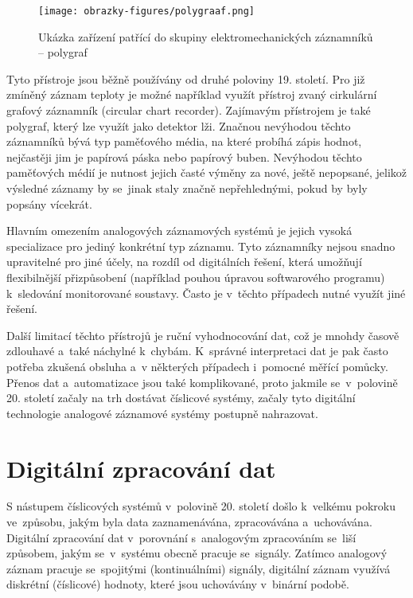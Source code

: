 
\begin{figure}[h] %
    \centering
    \texttt{[image: obrazky-figures/polygraaf.png]}
    \caption{Ukázka zařízení patřící do skupiny elektromechanických záznamníků -- polygraf~\cite{polygraph_picture}}
    \label{fig:polygraaf}
\end{figure}


Tyto přístroje jsou běžně používány od druhé poloviny 19. století. Pro již zmíněný záznam teploty je možné například využít přístroj zvaný cirkulární grafový záznamník (circular chart recorder). Zajímavým přístrojem je také polygraf, který lze využít jako detektor lži. Značnou nevýhodou těchto záznamníků bývá typ paměťového média, na které probíhá zápis hodnot, nejčastěji jim je papírová páska nebo papírový buben. Nevýhodou těchto paměťových médií je nutnost jejich časté výměny za nové, ještě nepopsané, jelikož výsledné záznamy by se~jinak staly značně nepřehlednými, pokud by byly popsány vícekrát.~\cite{origin_of_chart_recorders}

Hlavním omezením analogových záznamových systémů je jejich vysoká specializace pro jediný konkrétní typ záznamu. Tyto záznamníky nejsou snadno upravitelné pro jiné účely, na rozdíl od digitálních řešení, která umožňují flexibilnější přizpůsobení (například pouhou úpravou softwarového programu) k~sledování monitorované soustavy. Často je v~těchto případech nutné využít jiné řešení.~\cite{analog_signal_and_digital_signal_processing_Tel_System}

Další limitací těchto přístrojů je ruční vyhodnocování dat, což je mnohdy časově zdlouhavé a~také náchylné k~chybám. K~správné interpretaci dat je pak často potřeba zkušená obsluha a~v některých případech i~pomocné měřící pomůcky. Přenos dat a~automatizace jsou také komplikované, proto jakmile se~v~polovině 20. století začaly na trh dostávat číslicové systémy, začaly tyto digitální technologie analogové záznamové systémy postupně nahrazovat.~\cite{rcp_analog_vs_digital, newcastle_history_of_digital_computers}


\section{Digitální zpracování dat}
\label{digitalni_zaznam_dat}
S nástupem číslicových systémů v~polovině 20. století došlo k~velkému pokroku ve~způsobu, jakým byla data zaznamenávána, zpracovávána a~uchovávána. Digitální zpracování dat v~porovnání s~analogovým zpracováním se~liší způsobem, jakým se~v~systému obecně pracuje se~signály. Zatímco analogový záznam pracuje se~spojitými (kontinuálními) signály, digitální záznam využívá diskrétní (číslicové) hodnoty, které jsou uchovávány v~binární podobě.


